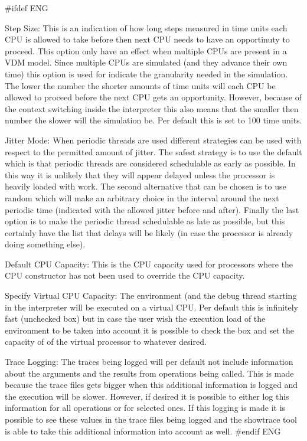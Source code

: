 \documentclass[\pformat,12pt]{article}
\begin{document}
\begin{list}{}{}
#ifdef ENG
\item[{\sf Step Size}:] This is an indication of how long steps
measured in time units each CPU is allowed to take before then next
CPU needs to have an opportinuty to proceed. This option only have an
effect when multiple CPUs are present in a VDM model. Since multiple
CPUs are simulated (and they advance their own time) this option is
used for indicate the granularity needed in the simulation. The lower
the number the shorter amounts of time units will each CPU be allowed
to proceed before the next CPU gets an opportunity. However, because
of the context switching inside the interpreter this also means that
the smaller then number the slower will the simulation be. Per default
this is set to 100 time units.

\item[{\sf Jitter Mode}:] When periodic threads are used different
strategies can be used with respect to the permitted amount of
jitter. The safest strategy is to use the default which is that
periodic threads are considered schedulable as {\sf early} as
possible. In this way it is unlikely that they will appear delayed
unless the processor is heavily loaded with work. The second
alternative that can be chosen is to use {\sf random} which will make
an arbitrary choice in the interval around the next periodic time
(indicated with the allowed jitter before and after). Finally the last
option is to make the periodic thread schedulable as {\sf late} as
possible, but this certainly have the list that delays will be likely
(in case the processor is already doing something else).

\item[{\sf Default CPU Capacity}:] This is the CPU capacity used for
processors where the CPU constructor has not been used to override the
CPU capacity. 

\item[{\sf Specify Virtual CPU Capacity}:] The environment (and the
debug thread starting in the interpreter will be executed on a virtual
CPU. Per default this is infinitely fast (unchecked box) but in case
the user wish the execution load of the environment to be taken into
account it is possible to check the box and set the capacity of of the
virtual processor to whatever desired. 

\item[{\sf Trace Logging}:] The traces being logged will per default
not include information about the arguments and the results from
operations being called. This is made because the trace files gets
bigger when this additional information is logged and the execution
will be slower. However, if desired it is possible to either log this
information for all operations or for selected ones. If this logging
is made it is possible to see these values in the trace files being
logged and the {\sf showtrace} tool is able to take this additional
information into account as well.
#endif ENG


\end{list}
\end{document}
